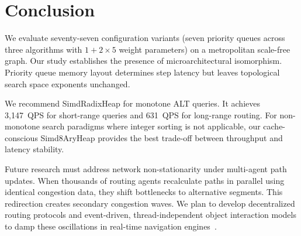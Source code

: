 \section{Conclusion}
\label{sec:conclusion}

We evaluate seventy-seven configuration variants (seven priority queues across three algorithms with $1 + 2 \times 5$ weight parameters) on a metropolitan scale-free graph. 
Our study establishes the presence of microarchitectural isomorphism. 
Priority queue memory layout determines step latency but leaves topological search space exponents unchanged. 

We recommend SimdRadixHeap for monotone ALT queries. 
It achieves 3,147~QPS for short-range queries and 631~QPS for long-range routing. 
For non-monotone search paradigms where integer sorting is not applicable, our cache-conscious Simd8AryHeap provides the best trade-off between throughput and latency stability. 

Future research must address network non-stationarity under multi-agent path updates. 
When thousands of routing agents recalculate paths in parallel using identical congestion data, they shift bottlenecks to alternative segments. 
This redirection creates secondary congestion waves. 
We plan to develop decentralized routing protocols and event-driven, thread-independent object interaction models to damp these oscillations in real-time navigation engines~\cite{butorin2026thread}.
